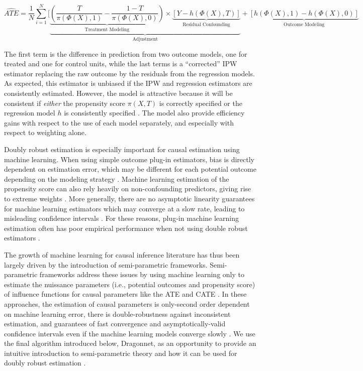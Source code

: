 \begin{equation}
\hat{ATE} = \frac{1}{N}\sum_{i=1}^N{[\underbrace{\underbrace{(\frac{T}{\pi(\Phi(X),1)}-\frac{1-T}{\pi(\Phi(X),0)})}_{\text{Treatment Modeling}}\times\underbrace{[Y-h(\Phi(X),T)]}_{\text{Residual Confounding}}}_{\text{Adjustment}} +\underbrace{[h(\Phi(X),1)-h(\Phi(X),0)]}_{\text{Outcome Modeling}}}
\end{equation}


The first term is the difference in prediction from two outcome models, one for treated and one for 
control units, while the last terms is a ``corrected'' IPW estimator replacing the raw outcome by the residuals from the regression models. As expected, this estimator is unbiased if the IPW and regression estimators are consistently estimated. However, the model is attractive because it will be consistent if \textit{either} the propensity score $\pi(X,T)$ is correctly specified or the regression model $h$ is consistently specified \citep{glynn2010introduction}. The model also provide efficiency gains with respect to the use of each model separately, and especially with respect to weighting alone. 

Doubly robust estimation is especially important for causal estimation using machine learning. When using simple outcome plug-in estimators, bias is directly dependent on estimation error, which may be different for each potential outcome depending on the modeling strategy \citep{kennedy2020}. Machine learning estimation of the propensity score can also rely heavily on non-confounding predictors, giving rise to extreme weights \citep{schnitzer2016variable}. More generally, there are no asymptotic linearity guarantees for machine learning estimators which may converge at a slow rate, leading to misleading confidence intervals \citep{naimi2021,zivich2021machine}. For these reasons, plug-in machine learning estimation often has poor empirical performance when not using double robust estimators \citep{benkeser2017,kennedy2020,zivich2021machine}.

The growth of machine learning for causal
inference literature has thus been largely driven by the introduction of semi-parametric frameworks. Semi-parametric frameworks  address these issues by using machine learning only to estimate the nuissance parameters (i.e., potential outcomes and propensity score) of influence functions for causal parameters like the ATE and CATE \citep{chernozhukov2016double,kennedy2016semiparametric,van2011targeted}. In these approaches, the estimation of causal parameters is only-second order dependent on machine learning error, there is double-robustness against inconsistent estimation, and guarantees of fast convergence and asymptotically-valid confidence intervals even if the machine learning models converge slowly \citep{benkeser2017,kennedy2020,naimi2021,zivich2021machine}. We use the final algorithm introduced below, Dragonnet, as an opportunity to provide an intuitive introduction to semi-parametric theory and how it can be used for doubly robust estimation \citep{Shi2019}.
